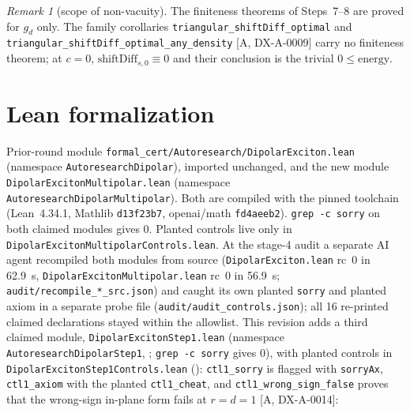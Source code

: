 \documentclass[11pt]{article}
\theoremstyle{remark}
\newtheorem{remark}[theorem]{Remark}
\newcommand{\tier}[1]{\textsf{[#1]}}
\newcommand{\lean}[1]{\texttt{#1}}
\begin{document}
\begin{remark}[scope of non-vacuity]\label{rem:c0}
The finiteness theorems of Steps~7--8 are proved for $g_d$ only. The family corollaries
\lean{triangular\_shiftDiff\_optimal} and \lean{triangular\_shiftDiff\_optimal\_any\_density} \tier{A, DX-A-0009} carry no
finiteness theorem; at $c=0$, $\mathrm{shiftDiff}_{s,0}\equiv0$ and their conclusion is the trivial $0\le\mathrm{energy}$.
\end{remark}



\section{Lean formalization}\label{sec:lean}
Prior-round module \texttt{formal\_cert/Autoresearch/DipolarExciton.lean} (namespace \lean{AutoresearchDipolar}),
imported unchanged, and the new module \texttt{DipolarExcitonMultipolar.lean} (namespace
\lean{AutoresearchDipolarMultipolar}). Both are compiled with the pinned toolchain (Lean~4.34.1, Mathlib
\texttt{d13f23b7}, openai/math \texttt{fd4aeeb2}). \texttt{grep -c sorry} on both claimed modules gives 0. Planted
controls live only in \texttt{DipolarExcitonMultipolarControls.lean}. At the stage-4 audit a separate AI agent
recompiled both modules from source (\texttt{DipolarExciton.lean} rc~0 in 62.9~s, \texttt{DipolarExcitonMultipolar.lean}
rc~0 in 56.9~s; \texttt{audit/recompile\_*\_src.json}) and caught its own planted \lean{sorry} and planted axiom in a
separate probe file (\texttt{audit/audit\_controls.json}); all 16 re-printed claimed declarations stayed within the
allowlist. This revision adds a third claimed module, \texttt{DipolarExcitonStep1.lean} (namespace
\lean{AutoresearchDipolarStep1}, \DXStepOneBuild; \texttt{grep -c sorry} gives 0), with planted controls in
\texttt{DipolarExcitonStep1Controls.lean} (\DXStepOneCtl): \lean{ctl1\_sorry} is flagged with \lean{sorryAx},
\lean{ctl1\_axiom} with the planted \lean{ctl1\_cheat}, and \lean{ctl1\_wrong\_sign\_false} proves that the wrong-sign
in-plane form fails at $r=d=1$ \tier{A, DX-A-0014}:






\end{document}
